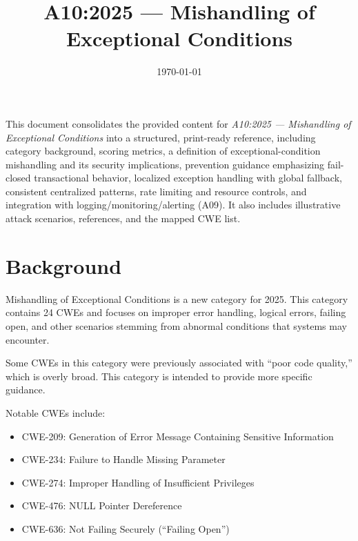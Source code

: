 \documentclass[11pt]{article}
\title{\textbf{A10:2025 — Mishandling of Exceptional Conditions}}
\date{\today}
\begin{document}
\maketitle

\begin{infobox}
This document consolidates the provided content for \textit{A10:2025 — Mishandling of Exceptional Conditions} into a structured, print-ready reference, including category background, scoring metrics, a definition of exceptional-condition mishandling and its security implications, prevention guidance emphasizing fail-closed transactional behavior, localized exception handling with global fallback, consistent centralized patterns, rate limiting and resource controls, and integration with logging/monitoring/alerting (A09). It also includes illustrative attack scenarios, references, and the mapped CWE list.
\end{infobox}

\tableofcontents
\newpage

\section{Background}
Mishandling of Exceptional Conditions is a new category for 2025. This category contains 24 CWEs and focuses on improper error handling, logical errors, failing open, and other scenarios stemming from abnormal conditions that systems may encounter.

Some CWEs in this category were previously associated with ``poor code quality,'' which is overly broad. This category is intended to provide more specific guidance.

Notable CWEs include:
\begin{itemize}
  \item CWE-209: Generation of Error Message Containing Sensitive Information
  \item CWE-234: Failure to Handle Missing Parameter
  \item CWE-274: Improper Handling of Insufficient Privileges
  \item CWE-476: NULL Pointer Dereference
  \item CWE-636: Not Failing Securely (``Failing Open'')
\end{itemize}
\end{document}
